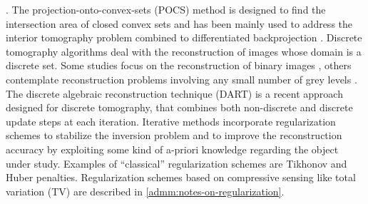 {\cite{Wang2012,Ramani2012,Chun2014}. 
\newline
The projection-onto-convex-sets (POCS) method \cite{Gubin1967} is designed to find the intersection area of
closed convex sets and has been mainly used to address the interior tomography problem combined to differentiated backprojection
\cite{Defrise2006}.
\newline
Discrete tomography algorithms \cite{Herman1999} deal with the reconstruction of images whose domain is a discrete set.
Some studies focus on the reconstruction of binary images \cite{Schle2005,Batenburg2007}, others contemplate reconstruction problems
involving any small number of grey levels \cite{Alpers2006,Liao2005}. The discrete algebraic reconstruction technique (DART) \cite{Batenburg2011}
is a recent approach designed for discrete tomography, that combines both non-discrete and discrete update steps at each iteration.
\newline
Iterative methods incorporate regularization schemes to stabilize the inversion problem and to improve the reconstruction accuracy
by exploiting some kind of a-priori knowledge regarding the object under study.
Examples of ``classical'' regularization schemes are Tikhonov \cite{Tikhonov1977} and Huber \cite{Huber1964} penalties.
Regularization schemes based on compressive sensing \cite{Donoho2006} like total variation (TV) \cite{Rudin1992} are described in 
\ref{admm:notes-on-regularization}.
}
